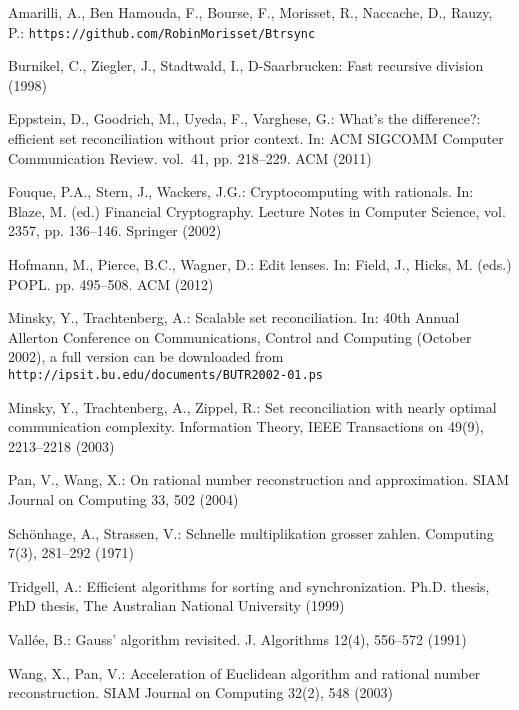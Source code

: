 \documentclass[11pt]{llncs}
\begin{document}
\begin{thebibliography}{10}
\providecommand{\url}[1]{\texttt{#1}}
\providecommand{\urlprefix}{URL }

Amarilli, A., {Ben Hamouda}, F., Bourse, F., Morisset, R., Naccache, D., Rauzy,
  P.: \url{https://github.com/RobinMorisset/Btrsync}

Burnikel, C., Ziegler, J., Stadtwald, I., D-Saarbrucken: Fast recursive
  division (1998)

Eppstein, D., Goodrich, M., Uyeda, F., Varghese, G.: What's the difference?:
  efficient set reconciliation without prior context. In: ACM SIGCOMM Computer
  Communication Review. vol.~41, pp. 218--229. ACM (2011)

Fouque, P.A., Stern, J., Wackers, J.G.: Cryptocomputing with rationals. In:
  Blaze, M. (ed.) Financial Cryptography. Lecture Notes in Computer Science,
  vol. 2357, pp. 136--146. Springer (2002)

Hofmann, M., Pierce, B.C., Wagner, D.: Edit lenses. In: Field, J., Hicks, M.
  (eds.) POPL. pp. 495--508. ACM (2012)

Minsky, Y., Trachtenberg, A.: Scalable set reconciliation. In: 40th Annual
  Allerton Conference on Communications, Control and Computing (October 2002),
  a full version can be downloaded from
  \url{http://ipsit.bu.edu/documents/BUTR2002-01.ps}

Minsky, Y., Trachtenberg, A., Zippel, R.: Set reconciliation with nearly
  optimal communication complexity. Information Theory, IEEE Transactions on
  49(9),  2213--2218 (2003)

Pan, V., Wang, X.: On rational number reconstruction and approximation. SIAM
  Journal on Computing  33,  502 (2004)

Sch{\"o}nhage, A., Strassen, V.: Schnelle multiplikation grosser zahlen.
  Computing  7(3),  281--292 (1971)

Tridgell, A.: Efficient algorithms for sorting and synchronization. Ph.D.
  thesis, PhD thesis, The Australian National University (1999)

Vall{\'e}e, B.: Gauss' algorithm revisited. J. Algorithms  12(4),  556--572
  (1991)

Wang, X., Pan, V.: Acceleration of {E}uclidean algorithm and rational number
  reconstruction. SIAM Journal on Computing  32(2),  548 (2003)

\end{thebibliography}
\end{document}
